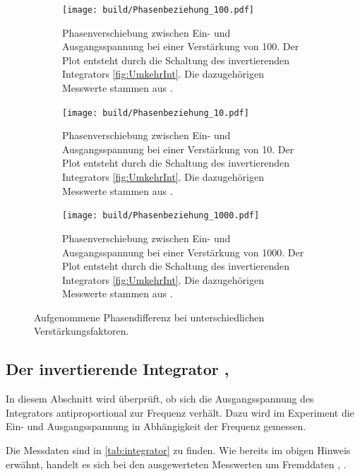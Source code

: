 \begin{figure}
    \centering
    \begin{subfigure}[b]{0.45\textwidth}
        \centering
        \texttt{[image: build/Phasenbeziehung\_100.pdf]}
        \caption{Phasenverschiebung zwischen Ein- und Ausgangsspannung bei einer Verstärkung von 100.
        Der Plot entsteht durch die Schaltung des invertierenden Integrators \autoref{fig:UmkehrInt}.
        Die dazugehörigen Messwerte stammen aus \cite{int_data}.
        }
        \label{fig:phase_100}
    \end{subfigure}
    \hfill
    \begin{subfigure}[b]{0.45\textwidth}
        \centering
        \texttt{[image: build/Phasenbeziehung\_10.pdf]}
        \caption{Phasenverschiebung zwischen Ein- und Ausgangsspannung bei einer Verstärkung von 10.
        Der Plot entsteht durch die Schaltung des invertierenden Integrators \autoref{fig:UmkehrInt}.
        Die dazugehörigen Messwerte stammen aus \cite{int_data}.}
        \label{fig:phase_10}
    \end{subfigure} 
    \newline
    \newline   
    \newline   
    \newline   
    \begin{subfigure}[b]{0.45\textwidth}
        \centering
        \texttt{[image: build/Phasenbeziehung\_1000.pdf]}
        \caption{Phasenverschiebung zwischen Ein- und Ausgangsspannung bei einer Verstärkung von 1000.
        Der Plot entsteht durch die Schaltung des invertierenden Integrators \autoref{fig:UmkehrInt}.
        Die dazugehörigen Messwerte stammen aus \cite{int_data}.}
        \label{fig:phase_1000}
    \end{subfigure}
       \caption{Aufgenommene Phasendifferenz bei unterschiedlichen Verstärkungsfaktoren.}
       \label{fig:phase}
\end{figure}
\clearpage

\subsection{Der invertierende Integrator \cite{int_data}, \cite{int_picture}}
In diesem Abschnitt wird überprüft, ob sich die Ausgangsspannung des Integrators antiproportional 
zur Frequenz verhält.
Dazu wird im Experiment die Ein- und Ausgangsspannung in Abhängigkeit der Frequenz gemessen.

Die Messdaten sind in \autoref{tab:integrator} zu finden. 
Wie bereits im obigen Hinweis erwähnt, handelt es sich bei den ausgewerteten Messwerten
um Fremddaten \cite{int_data}, \cite{int_picture}.

